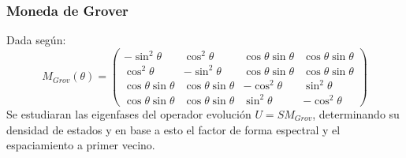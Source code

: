 \documentclass[12pt,a4paper]{article}
\begin{document}
\subsubsection{Moneda de Grover}
Dada según:
\begin{equation}
    M_{Grov}(\theta) = 
\begin{pmatrix}
-\sin^2\theta & \cos^2\theta & \cos\theta\sin\theta & \cos\theta\sin\theta \\
\cos^2\theta & -\sin^2\theta & \cos\theta\sin\theta & \cos\theta\sin\theta \\
\cos\theta\sin\theta & \cos\theta\sin\theta & -\cos^2\theta & \sin^2\theta \\
\cos\theta\sin\theta & \cos\theta\sin\theta & \sin^2\theta & -\cos^2\theta
\end{pmatrix}
    \label{eq:GroverCoin}
\end{equation}
Se estudiaran las eigenfases del operador evolución $U=SM_{Grov}$, determinando su densidad de estados y en base a esto 
el factor de forma espectral y el espaciamiento a primer vecino.
\end{document}
